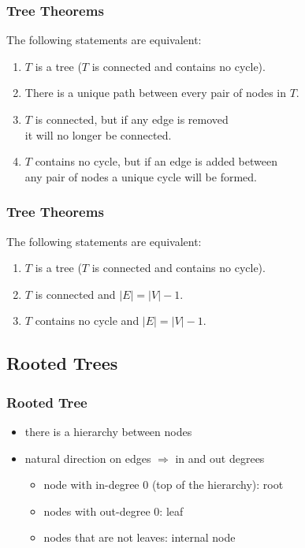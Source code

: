 \documentclass[dvipsnames]{beamer}
\begin{document}
\begin{frame}
  \frametitle{Tree Theorems}

  \begin{theorem}
    The following statements are equivalent:

    \begin{enumerate}
      \item $T$ is a tree ($T$ is connected and contains no cycle).
      \item There is a unique path between every pair of nodes in $T$.
      \item $T$ is connected, but if any edge is removed\\
	it will no longer be connected.
      \item $T$ contains no cycle, but if an edge is added between\\
	any pair of nodes a unique cycle will be formed.
    \end{enumerate}
  \end{theorem}
\end{frame}

\begin{frame}[label=theoremset2]
  \frametitle{Tree Theorems}

  \begin{theorem}
    The following statements are equivalent:

    \begin{enumerate}
      \item $T$ is a tree ($T$ is connected and contains no cycle).
      \item $T$ is connected and $|E| = |V| - 1$.
      \item $T$ contains no cycle and $|E| = |V| - 1$.
    \end{enumerate}
  \end{theorem}
\end{frame}

\subsection{Rooted Trees}

\begin{frame}
  \frametitle{Rooted Tree}

  \begin{itemize}
    \item there is a hierarchy between nodes

    \pause
    \item natural direction on edges $\Rightarrow$ in and out degrees
    \begin{itemize}
      \item node with in-degree 0 (top of the hierarchy): \alert{root}
      \item nodes with out-degree 0: \alert{leaf}
      \item nodes that are not leaves: \alert{internal node}
    \end{itemize}
  \end{itemize}
\end{frame}
\end{document}
